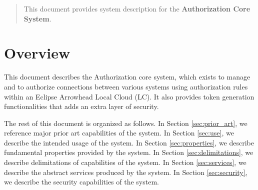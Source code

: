 \documentclass[a4paper]{arrowhead}
\begin{document}
\ArrowheadDate{\today}
\ArrowheadSetup

\begin{center}
  \vspace*{1cm}
  \huge{\arrowtitle}

  \vspace*{0.2cm}
  \LARGE{\arrowtype}
  \vspace*{1cm}

  \vspace*{\fill}


  \vspace*{1cm}
  \vspace*{\fill}

  \begin{abstract}
    This document provides system description for the \textbf{Authorization Core System}.
  \end{abstract}

  \vspace*{1cm}

 \end{center}

\newpage

\tableofcontents
\newpage

\section{Overview}
\label{sec:overview}
\color{black}
This document describes the Authorization core system, which exists to manage and to authorize
connections between various systems using authorization rules within an Eclipse Arrowhead Local Cloud (LC). It also provides token generation functionalities that adds an extra layer of security. 

The rest of this document is organized as follows.
In Section \ref{sec:prior_art}, we reference major prior art capabilities
of the system.
In Section \ref{sec:use}, we describe the intended usage of the system.
In Section \ref{sec:properties}, we describe fundamental properties
provided by the system.
In Section \ref{sec:delimitations}, we describe delimitations of capabilities
of the system.
In Section \ref{sec:services}, we describe the abstract services produced by the system.
In Section \ref{sec:security}, we describe the security capabilities
of the system.
\end{document}
